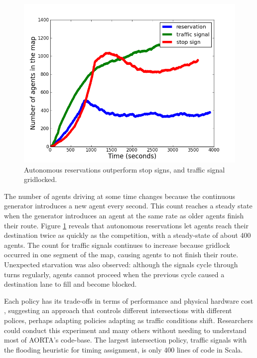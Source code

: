 \documentclass[letterpaper, 10 pt, conference]{ieeeconf}  %
\begin{document}
\begin{figure}[h]
  \centering \includegraphics[width=\linewidth]{agent_cnt_atx.png}
  \caption{Autonomous reservations outperform stop signs, and traffic signal
           gridlocked.}
  \label{fig:agent_cnt}
  \vspace{-10pt}
\end{figure}

The number of agents driving at some time changes because the continuous
generator introduces a new agent every second. This count reaches a steady
state when the generator introduces an agent at the same rate as older agents
finish their route. Figure \ref{fig:agent_cnt} reveals that autonomous
reservations let agents reach their destination twice as quickly as the
competition, with a steady-state of about 400 agents. The count for traffic
signals continues to increase because gridlock occurred in one segment of the
map, causing agents to not finish their route.  Unexpected starvation was also
observed: although the signals cycle through turns regularly, agents cannot
proceed when the previous cycle caused a destination lane to fill and become
blocked.

Each policy has its trade-offs in terms of performance and physical hardware
cost , suggesting an approach that
controls different intersections with different polices, perhaps adapting
policies adapting as traffic conditions shift.  Researchers could conduct this
experiment and many others without needing to understand most of AORTA's
code-base. The largest intersection policy, traffic signals with the flooding
heuristic for timing assignment, is only 400 lines of code in Scala.
\end{document}
